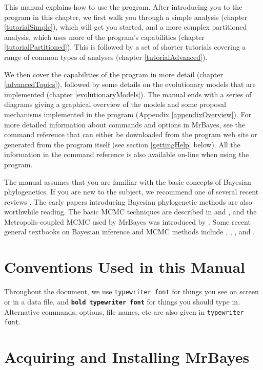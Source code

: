 \documentclass[12pt]{book}
\newcommand{\ttt}[1]{\texttt{#1}}
\newcommand{\tb}[1]{\ttt{\textbf{#1}}}
\begin{document}
This manual explains how to use the program. After introducing you to the program in this chapter,
we first walk you through a simple analysis (chapter \ref{tutorialSimple}), which will get you
started, and a more complex partitioned analysis, which uses more of the program's capabilities
(chapter \ref{tutorialPartitioned}). This is followed by a set of shorter tutorials covering a
range of common types of analyses (chapter \ref{tutorialAdvanced}).

We then cover the capabilities of the program in more detail (chapter \ref{advancedTopics}),
followed by some details on the evolutionary models that are implemented (chapter
\ref{evolutionaryModels}). The manual ends with a series of diagrams giving a graphical overview of
the models and some proposal mechanisms implemented in the program (Appendix
\ref{appendixOverview}). For more detailed information about commands and options in MrBayes, see
the command reference that can either be downloaded from the program web site or generated from the
program itself (see section \ref{gettingHelp} below). All the information in the command reference
is also available on-line when using the program.

The manual assumes that you are familiar with the basic concepts of Bayesian phylogenetics. If you
are new to the subject, we recommend one of several recent reviews \citep{lewis01, holder03,
ronquist10}. The early papers introducing Bayesian phylogenetic methods \citep{li96, mau96,
rannala96, mau97, larget99, mau99, newton99} are also worthwhile reading. The basic MCMC techniques
are described in \citet{metropolis53} and \citet{hastings70}, and the Metropolis-coupled MCMC used
by MrBayes was introduced by \citet{geyer91}. Some recent general textbooks on Bayesian inference
and MCMC methods include \citet{gilks96a}, \citet{carlin00}, \citet{gelman03}, and
\citet{gamerman06}.


\section{Conventions Used in this Manual}

Throughout the document, we use \ttt{typewriter font} for things you see on screen or in a data
file, and \tb{bold typewriter font} for things you should type in. Alternative commands, options,
file names, etc are also given in \ttt{typewriter font}.

\section{Acquiring and Installing MrBayes}
\end{document}
